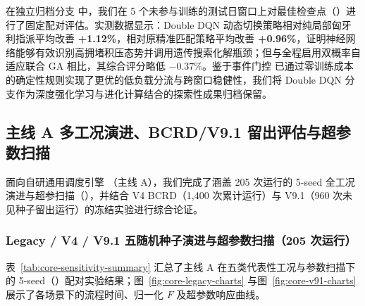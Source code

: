 在独立归档分支  中，我们在 5 个未参与训练的测试日窗口上对最佳检查点（）进行了固定配对评估。实测数据显示：Double DQN 动态切换策略相对纯局部匈牙利指派平均改善 \textbf{+1.12\%}，相对原精准匹配策略平均改善 \textbf{+0.96\%}，证明神经网络能够有效识别高拥堵积压态势并调用遗传搜索化解瓶颈；但与全程启用双概率自适应联合 GA 相比，其综合评分略低 $-0.37\%$。鉴于事件门控  已通过零训练成本的确定性规则实现了更优的低负载分流与跨窗口稳健性，我们将 Double DQN 分支作为深度强化学习与进化计算结合的探索性成果归档保留。

\subsection{主线 A 多工况演进、BCRD/V9.1 留出评估与超参数扫描}

面向自研通用调度引擎 （主线 A），我们完成了涵盖 205 次运行的 5-seed 全工况演进与超参扫描（），并结合 V4 BCRD（1,400 次累计运行）与 V9.1（960 次未见种子留出运行）的冻结实验进行综合论证。

\subsubsection{Legacy / V4 / V9.1 五随机种子演进与超参数扫描（205 次运行）}

表~\ref{tab:core-sensitivity-summary} 汇总了主线 A 在五类代表性工况与参数扫描下的 5-seed（）配对实验结果；图~\ref{fig:core-legacy-charts} 与图~\ref{fig:core-v91-charts} 展示了各场景下的流程时间、归一化 $F$ 及超参数响应曲线。

